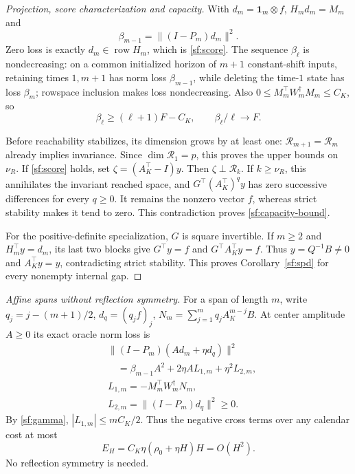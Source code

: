 \documentclass[journal]{IEEEtran}
\begin{document}
\begin{proof}[Projection, score characterization and capacity]
With $d_m=\mathbf1_m\otimes f$, $H_md_m=M_m$ and
\[
\beta_{m-1}=\|(I-P_m)d_m\|^2.
\]
Zero loss is exactly $d_m\in\operatorname{row}H_m$, which is
\eqref{sf:score}.
The sequence $\beta_\ell$ is nondecreasing: on a common initialized
horizon of $m+1$ constant-shift inputs, retaining times $1,m+1$
has norm loss $\beta_{m-1}$, while deleting the time-$1$ state has
loss $\beta_m$; rowspace inclusion makes loss nondecreasing.
Also $0\le M_m^\top W_m^\dagger M_m\le C_K$, so
\begin{equation}\label{sf:tail}
\beta_\ell\ge(\ell+1)F-C_K,\qquad \beta_\ell/\ell\longrightarrow F.
\end{equation}

Before reachability stabilizes, its dimension grows by at least one:
$\mathcal R_{m+1}=\mathcal R_m$ already implies invariance.
Since $\dim\mathcal R_1=p$, this proves the upper bounds on $\nu_R$.
If \eqref{sf:score} holds, set $\zeta=(A_K^\top-I)y$.
Then $\zeta\perp\mathcal R_k$.
If $k\ge\nu_R$, this annihilates the invariant reached space, and
$G^\top(A_K^\top)^q y$ has zero successive differences for every
$q\ge0$. It remains the nonzero vector $f$, whereas strict stability
makes it tend to zero. This contradiction proves
\eqref{sf:capacity-bound}.

For the positive-definite specialization, $G$ is square invertible.
If $m\ge2$ and $H_m^\top y=d_m$, its last two blocks give
$G^\top y=f$ and $G^\top A_K^\top y=f$. Thus
$y=Q^{-1}B\ne0$ and $A_K^\top y=y$, contradicting strict stability.
This proves Corollary~\ref{sf:spd} for every nonempty internal gap.
\end{proof}

\par\smallskip\noindent\textit{Affine spans without reflection symmetry.}\enspace 
For a span of length $m$, write $q_j=j-(m+1)/2$,
$d_q=(q_jf)_j$, $N_m=\sum_{j=1}^m q_jA_K^{m-j}B$.
At center amplitude $A\ge0$ its exact oracle norm loss is
\begin{equation}\label{sf:affine}
\begin{aligned}
&\|(I-P_m)(A d_m+\eta d_q)\|^2\\
&\quad=\beta_{m-1}A^2+2\eta A L_{1,m}+\eta^2L_{2,m},\\
&L_{1,m}=-M_m^\top W_m^\dagger N_m,\\
&L_{2,m}=\|(I-P_m)d_q\|^2\ge0 .
\end{aligned}
\end{equation}
By \eqref{sf:gamma}, $|L_{1,m}|\le mC_K/2$.
Thus the negative cross terms over any calendar cost at most
\begin{equation}\label{sf:cross-budget}
E_H=C_K\eta(\rho_0+\eta H)H=O(H^2).
\end{equation}
No reflection symmetry is needed.
\end{document}
